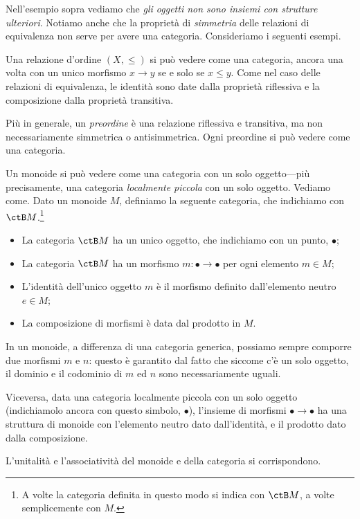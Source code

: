 Nell'esempio sopra vediamo che \emph{gli oggetti non sono insiemi con strutture ulteriori}.
Notiamo anche che la proprietà di \emph{simmetria} delle relazioni di equivalenza non serve per avere una categoria. Consideriamo i seguenti esempi.

\begin{examples}
 Una relazione d'ordine $(X,\le)$ si può vedere come una categoria, ancora una volta con un unico morfismo $x\to y$ se e solo se $x\le y$. Come nel caso delle relazioni di equivalenza, le identità sono date dalla proprietà riflessiva e la composizione dalla proprietà transitiva.

 Più in generale, un \emph{preordine} è una relazione riflessiva e transitiva, ma non necessariamente simmetrica o antisimmetrica. Ogni preordine si può vedere come una categoria.
\end{examples}


\begin{example}
 Un monoide si può vedere come una categoria con un solo oggetto---più precisamente, una categoria \emph{localmente piccola} con un solo oggetto.
 Vediamo come. Dato un monoide $M$, definiamo la seguente categoria, che indichiamo con $\ctB M$.\footnote{A volte la categoria definita in questo modo si indica con $\ctB M$, a volte semplicemente con $M$.}
 \begin{itemize}
  \item La categoria $\ctB M$ ha un unico oggetto, che indichiamo con un punto, $\bullet$;
  \item La categoria $\ctB M$ ha un morfismo $m:\bullet\to\bullet$ per ogni elemento $m\in M$;
  \item L'identità dell'unico oggetto $m$ è il morfismo definito dall'elemento neutro $e\in M$;
  \item La composizione di morfismi è data dal prodotto in $M$.
 \end{itemize}
 In un monoide, a differenza di una categoria generica, possiamo sempre comporre due morfismi $m$ e $n$: questo è garantito dal fatto che siccome c'è un solo oggetto, il dominio e il codominio di $m$ ed $n$ sono necessariamente uguali.

 Viceversa, data una categoria localmente piccola con un solo oggetto (indichiamolo ancora con questo simbolo, $\bullet$), l'insieme di morfismi $\bullet\to\bullet$ ha una struttura di monoide con l'elemento neutro dato dall'identità, e il prodotto dato dalla composizione.

 L'unitalità e l'associatività del monoide e della categoria si corrispondono.
\end{example}

